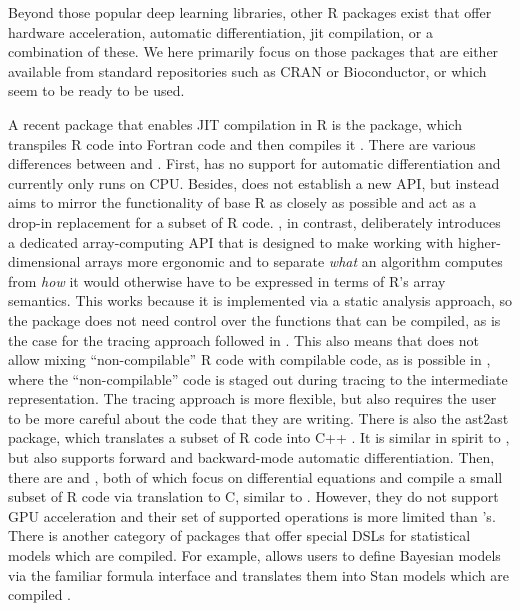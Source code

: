 Beyond those popular deep learning libraries, other R packages exist that offer hardware acceleration, automatic differentiation, jit compilation, or a combination of these.
We here primarily focus on those packages that are either available from standard repositories such as CRAN or Bioconductor, or which seem to be ready to be used.

A recent package that enables JIT compilation in R is the  package, which transpiles R code into Fortran code and then compiles it \citep{ref-quickr}.
There are various differences between  and .
First,  has no support for automatic differentiation and currently only runs on CPU.
Besides,  does not establish a new API, but instead aims to mirror the functionality of base R as closely as possible and act as a drop-in replacement for a subset of R code.
, in contrast, deliberately introduces a dedicated array-computing API that is designed to make working with higher-dimensional arrays more ergonomic and to separate \emph{what} an algorithm computes from \emph{how} it would otherwise have to be expressed in terms of R's array semantics.
This works because it is implemented via a static analysis approach, so the package does not need control over the functions that can be compiled, as is the case for the tracing approach followed in .
This also means that  does not allow mixing ``non-compilable'' R code with compilable code, as is possible in , where the ``non-compilable'' code is staged out during tracing to the intermediate representation.
The tracing approach is more flexible, but also requires the user to be more careful about the code that they are writing.
There is also the ast2ast package, which translates a subset of R code into C++ \citep{ref-ast2ast}.
It is similar in spirit to , but also supports forward and backward-mode automatic differentiation.
Then, there are  and , both of which focus on differential equations and compile a small subset of R code via translation to C, similar to .
However, they do not support GPU acceleration and their set of supported operations is more limited than 's.
There is another category of packages that offer special DSLs for statistical models which are compiled.
For example,  \citep{ref-brms} allows users to define Bayesian models via the familiar formula interface and translates them into Stan models which are compiled \citep{ref-stan}.
